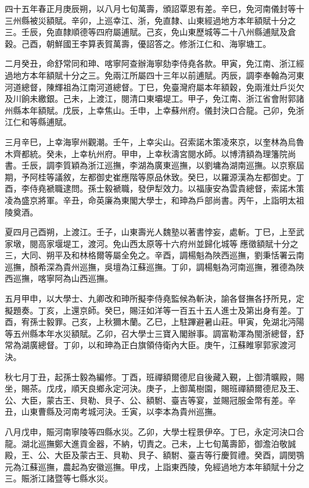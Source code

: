 \begin{pinyinscope}
四十五年春正月庚辰朔，以八月七旬萬壽，頒詔覃恩有差。辛巳，免河南儀封等十三州縣被災額賦。辛卯，上巡幸江、浙，免直隸、山東經過地方本年額賦十分之三。壬辰，免直隸順德等四府屬逋賦。己亥，免山東歷城等二十八州縣逋賦及倉穀。己酉，朝鮮國王李算表賀萬壽，優詔答之。修浙江仁和、海寧塘工。

二月癸丑，命舒常同和珅、喀寧阿查辦海寧劾李侍堯各款。甲寅，免江南、浙江經過地方本年額賦十分之三。免兩江所屬四十三年以前逋賦。丙辰，調李奉翰為河東河道總督，陳輝祖為江南河道總督。丁巳，免臺灣府屬本年額穀，免兩淮灶戶災欠及川餉未繳銀。己未，上渡江，閱清口東壩堤工。甲子，免江南、浙江省會附郭諸州縣本年額賦。戊辰，上幸焦山。壬申，上幸蘇州府。儀封決口合龍。己卯，免浙江仁和等縣逋賦。

三月辛巳，上幸海寧州觀潮。壬午，上幸尖山。召索諾木策凌來京，以奎林為烏魯木齊都統。癸未，上幸杭州府。甲申，上幸秋濤宮閱水師。以博清額為理籓院尚書。壬辰，調李質穎為浙江巡撫，李湖為廣東巡撫，以劉墉為湖南巡撫。以京察屆期，予阿桂等議敘，左都御史崔應階等原品休致。癸巳，以羅源漢為左都御史。丁酉，李侍堯褫職逮問。孫士毅褫職，發伊犁效力。以福康安為雲貴總督，索諾木策凌為盛京將軍。辛丑，命英廉為東閣大學士，和珅為戶部尚書。丙午，上詣明太祖陵奠酒。

夏四月己酉朔，上渡江。壬子，山東壽光人魏塾以著書悖妄，處斬。丁巳，上至武家墩，閱高家堰堤工，渡河。免山西太原等十六府州並歸化城等應徵額賦十分之三，大同、朔平及和林格爾等屬全免之。辛酉，調楊魁為陜西巡撫，劉秉恬署云南巡撫，顏希深為貴州巡撫，吳壇為江蘇巡撫。丁卯，調楊魁為河南巡撫，雅德為陜西巡撫，喀寧阿為山西巡撫。

五月甲申，以大學士、九卿改和珅所擬李侍堯監候為斬決，諭各督撫各抒所見，定擬題奏。丁亥，上還京師。癸巳，賜汪如洋等一百五十五人進士及第出身有差。丁酉，宥孫士毅罪。己亥，上秋獮木蘭。乙巳，上駐蹕避暑山莊。甲寅，免湖北沔陽等五州縣本年水災額賦。乙卯，召大學士三寶入閣辦事。調富勒渾為閩浙總督，舒常為湖廣總督。丁卯，以和珅為正白旗領侍衛內大臣。庚午，江蘇睢寧郭家渡河決。

秋七月丁丑，起孫士毅為編修。丁酉，班禪額爾德尼自後藏入覲，上御清曠殿，賜坐，賜茶。戊戌，順天良鄉永定河決。庚子，上御萬樹園，賜班禪額爾德尼及王、公、大臣，蒙古王、貝勒、貝子、公、額駙、臺吉等宴，並賜冠服金幣有差。辛丑，山東曹縣及河南考城河決。壬寅，以李本為貴州巡撫。

八月戊申，賑河南寧陵等四縣水災。乙卯，大學士程景伊卒。丁巳，永定河決口合龍。湖北巡撫鄭大進貢金器，不納，切責之。己未，上七旬萬壽節，御澹泊敬誠殿，王、公、大臣及蒙古王、貝勒、貝子、額駙、臺吉等行慶賀禮。癸酉，調閔鶚元為江蘇巡撫，農起為安徽巡撫。甲戌，上詣東西陵，免經過地方本年額賦十分之三。賑浙江諸暨等七縣水災。


\end{pinyinscope}
